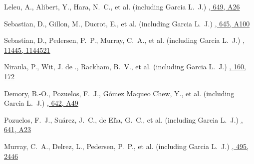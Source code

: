 {Leleu, A., Alibert, Y., Hara, N.~C., et al. (including Garcia L.~J.)}
{\href{https://ui.adsabs.harvard.edu/abs/2021A\&A...649A..26L}{\aap, 649, A26}}

{Sebastian, D., Gillon, M., Ducrot, E., et al. (including Garcia L.~J.)}
{\href{https://ui.adsabs.harvard.edu/abs/2021A\&A...645A.100S}{\aap, 645, A100}}

{Sebastian, D., Pedersen, P.~P., Murray, C.~A., et al. (including Garcia L.~J.)}
{\href{https://ui.adsabs.harvard.edu/abs/2020SPIE11445E..21S}{\procspie, 11445, 1144521}}

{Niraula, P., Wit, J. de ., Rackham, B.~V., et al. (including Garcia L.~J.)}
{\href{https://ui.adsabs.harvard.edu/abs/2020AJ....160..172N}{\aj, 160, 172}}

{Demory, B.-O., Pozuelos, F.~J., G{\'o}mez Maqueo Chew, Y., et al. (including Garcia L.~J.)}
{\href{https://ui.adsabs.harvard.edu/abs/2020A\&A...642A..49D}{\aap, 642, A49}}

{Pozuelos, F.~J., Su{\'a}rez, J.~C., de El{\'\i}a, G.~C., et al. (including Garcia L.~J.)}
{\href{https://ui.adsabs.harvard.edu/abs/2020A\&A...641A..23P}{\aap, 641, A23}}

{Murray, C.~A., Delrez, L., Pedersen, P.~P., et al. (including Garcia L.~J.)}
{\href{https://ui.adsabs.harvard.edu/abs/2020MNRAS.495.2446M}{\mnras, 495, 2446}}